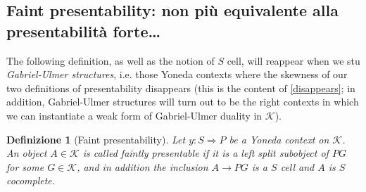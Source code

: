 \documentclass[11pt]{article}
\def\To{\Rightarrow}
\theoremstyle{reference}
\newtheorem{definition}[theorem]{Definizione}
\begin{document}
\subsection{Faint presentability: non più equivalente alla presentabilità forte\ldots{}}
\label{sec:org0a21951}

The following definition, as well as the notion of \(S\) cell, will reappear when we stu \emph{Gabriel-Ulmer structures}, i.e. those Yoneda contexts where the skewness of our two definitions of presentability disappears (this is the content of \autoref{disappears}; in addition, Gabriel-Ulmer structures will turn out to be the right contexts in which we can instantiate a weak form of Gabriel-Ulmer duality in \(\mathcal K\)).
\begin{definition}[Faint presentability]
	Let $y : S\To  P$ be a Yoneda context on $\mathcal K$. An object $A\in\mathcal K$ is called \emph{faintly presentable} if it is a left split subobject of $ P G$ for some $G\in\mathcal K$, and in addition the inclusion $A\to  P G$ is a $S$ cell and $A$ is $S$ cocomplete.
\end{definition}
\end{document}
